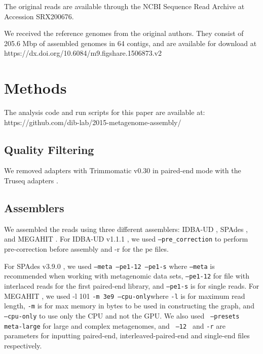 \documentclass[10pt,a4paper,twocolumn]{article}
\begin{document}
The original reads are available through the NCBI Sequence Read
Archive at Accession SRX200676.

We received the reference genomes from the original authors. They
consist of 205.6 Mbp of assembled genomes in 64 contigs, and are
available for download at
https://dx.doi.org/10.6084/m9.figshare.1506873.v2



\section*{Methods}
The analysis code and run scripts for this paper are available at:
https://github.com/dib-lab/2015-metagenome-assembly/

\subsection*{Quality Filtering} 

We removed adapters with Trimmomatic v0.30 in paired-end mode with the
Truseq adapters \cite{trimmomatic}.


\subsection*{Assemblers}
We assembled the reads using three different assemblers: IDBA-UD
\cite{idba}, SPAdes \cite{spades}, and MEGAHIT \cite{megahit}.  For
IDBA-UD v1.1.1 \cite{idba}, we used {\tt {--pre\_correction}} to
perform pre-correction before assembly and -r for the pe files.

For SPAdes v3.9.0 \cite{spades}, we used { \tt {--meta --pe1-12
    --pe1-s}} where {\tt{--meta}} is recommended when working with
metagenomic data sets, {\tt{--pe1-12}} for file with interlaced reads
for the first paired-end library, and {\tt{--pe1-s}} is for single
reads.
For MEGAHIT \cite{megahit}, we used -l 101 {\tt{-m 3e9
    --cpu-only}}where {\tt -l} is for maximum read length, {\tt -m} is
for max memory in bytes to be used in constructing the graph, and {\tt
  {--cpu-only}} to use only the CPU and not the GPU. We also used {\tt
  {--presets meta-large}} for large and complex metagenomes, and {\tt
  {--12} } and {\tt{-r}} are parameters for inputting paired-end,
interleaved-paired-end and single-end files respectively.
\end{document}
